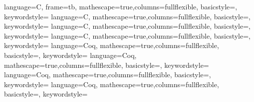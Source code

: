 

{
language=C,
frame=tb,
mathescape=true,columns=fullflexible,
basicstyle=\ttfamily\footnotesize,
keywordstyle=\ttfamily\footnotesize\bfseries
}
{
language=C,
mathescape=true,columns=fullflexible,
basicstyle=\ttfamily,
keywordstyle=\ttfamily
}
{
language=C,
mathescape=true,columns=fullflexible,
basicstyle=\ttfamily\scriptsize,
keywordstyle=\ttfamily\scriptsize
}
{
language=C,
mathescape=true,columns=fullflexible,
basicstyle=\ttfamily\small,
keywordstyle=\ttfamily\small\bfseries
}
{
language=Coq,
mathescape=true,columns=fullflexible,
basicstyle=\sffamily,
keywordstyle=\sffamily
}
{
language=Coq,
mathescape=true,columns=fullflexible,
basicstyle=\sffamily,
keywordstyle=\sffamily\bfseries
}
{
language=Coq,
mathescape=true,columns=fullflexible,
basicstyle=\sffamily,
keywordstyle=\sffamily
}
{
language=Coq,
mathescape=true,columns=fullflexible,
basicstyle=\sffamily,
keywordstyle=\sffamily\bfseries
}



\newcommand{\Ccode}[1]{\lstinline[language=C]{#1}}
\newcommand{\Coqcode}[1]{\lstinline[style=CoqTheorem-inline]{#1}}
